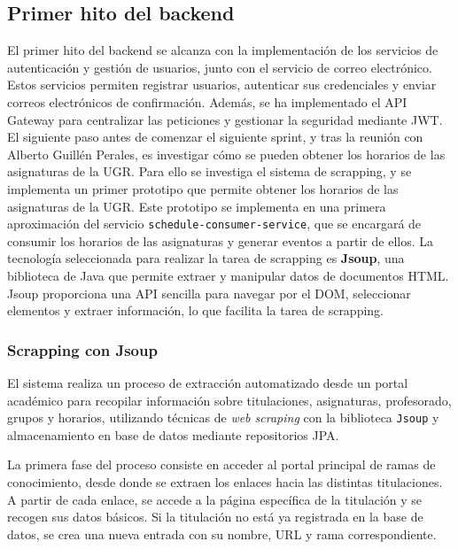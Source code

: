 \subsection{Primer hito del backend}
El primer hito del backend se alcanza con la implementación de los servicios de autenticación y gestión de usuarios, junto con el servicio de correo electrónico. Estos servicios permiten registrar usuarios, autenticar sus credenciales y enviar correos electrónicos de confirmación. Además, se ha implementado el API Gateway para centralizar las peticiones y gestionar la seguridad mediante JWT.
\newline\newline
El siguiente paso antes de comenzar el siguiente sprint, y tras la reunión con Alberto Guillén Perales, es investigar cómo se pueden obtener los horarios de las asignaturas de la UGR.
\newline\newline
Para ello se investiga el sistema de scrapping, y se implementa un primer prototipo que permite obtener los horarios de las asignaturas de la UGR. Este prototipo se implementa en una primera aproximación del servicio \texttt{schedule-consumer-service}, que se encargará de consumir los horarios de las asignaturas y generar eventos a partir de ellos.
\newline
La tecnología seleccionada para realizar la tarea de scrapping es \textbf{Jsoup}, una biblioteca de Java que permite extraer y manipular datos de documentos HTML. Jsoup proporciona una API sencilla para navegar por el DOM, seleccionar elementos y extraer información, lo que facilita la tarea de scrapping.

\subsubsection{Scrapping con Jsoup}

El sistema realiza un proceso de extracción automatizado desde un portal académico para recopilar información sobre titulaciones, asignaturas, profesorado, grupos y horarios, utilizando técnicas de \textit{web scraping} con la biblioteca \texttt{Jsoup} y almacenamiento en base de datos mediante repositorios JPA.

La primera fase del proceso consiste en acceder al portal principal de ramas de conocimiento, desde donde se extraen los enlaces hacia las distintas titulaciones. A partir de cada enlace, se accede a la página específica de la titulación y se recogen sus datos básicos. Si la titulación no está ya registrada en la base de datos, se crea una nueva entrada con su nombre, URL y rama correspondiente.

